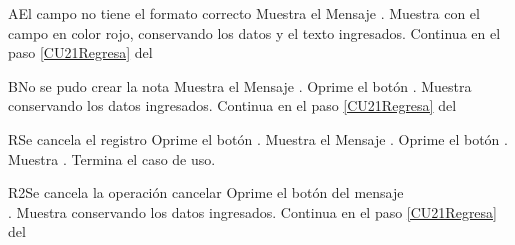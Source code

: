 
\begin{UCtrayectoriaA}{A}{El campo no tiene el formato correcto}
    \UCpaso Muestra el Mensaje \textbf{}.
    \UCpaso Muestra  con el campo en color rojo, conservando los datos y el texto ingresados.
	\UCpaso Continua en el paso \ref{CU21Regresa} del 
\end{UCtrayectoriaA}

\begin{UCtrayectoriaA}{B}{No se pudo crear la nota}
    \UCpaso Muestra el Mensaje \textbf{}.
    \UCpaso[\UCactor] Oprime el botón .
    \UCpaso Muestra  conservando los datos ingresados.
    \UCpaso Continua en el paso \ref{CU21Regresa} del 
\end{UCtrayectoriaA}

\begin{UCtrayectoriaA}{R}{Se cancela el registro}
	\UCpaso[\UCactor] Oprime el botón .
	\UCpaso Muestra el Mensaje \textbf{}.
    \UCpaso[\UCactor] Oprime el botón . 
	\UCpaso Muestra .
	\UCpaso Termina el caso de uso.
\end{UCtrayectoriaA}

\begin{UCtrayectoriaA}{R2}{Se cancela la operación cancelar}
    \UCpaso[\UCactor] Oprime el botón  del mensaje
        \\\textbf{}.
    \UCpaso Muestra  conservando los datos ingresados.
    \UCpaso Continua en el paso \ref{CU21Regresa} del 
\end{UCtrayectoriaA}
